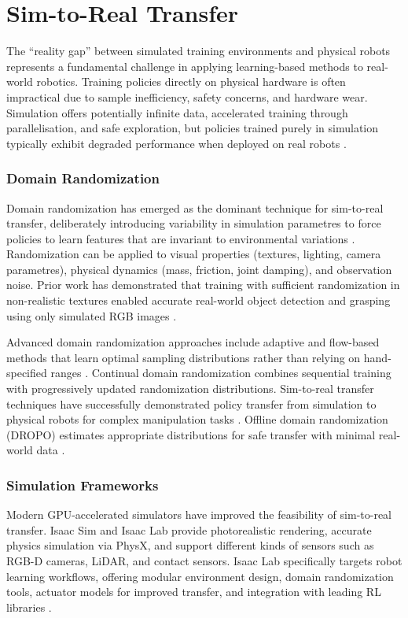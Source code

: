 \documentclass[12pt,a4paper,oneside]{report}
\begin{document}
\section{Sim-to-Real Transfer}

The ``reality gap'' between simulated training environments and physical robots represents a fundamental challenge in applying learning-based methods to real-world robotics. Training policies directly on physical hardware is often impractical due to sample inefficiency, safety concerns, and hardware wear. Simulation offers potentially infinite data, accelerated training through parallelisation, and safe exploration, but policies trained purely in simulation typically exhibit degraded performance when deployed on real robots \cite{zhaoSimtoRealTransferDeep2020b, muratoreSimtoRealTransferDeep2022, chengZeroshotSimtorealTransfer2023}.

\subsubsection{Domain Randomization}
Domain randomization has emerged as the dominant technique for sim-to-real transfer, deliberately introducing variability in simulation parametres to force policies to learn features that are invariant to environmental variations \cite{wengDomainRandomizationSim2Real2019}. Randomization can be applied to visual properties (textures, lighting, camera parametres), physical dynamics (mass, friction, joint damping), and observation noise. Prior work has demonstrated that training with sufficient randomization in non-realistic textures enabled accurate real-world object detection and grasping using only simulated RGB images \cite{tobinDomainRandomizationTransferring2017a}.

Advanced domain randomization approaches include adaptive and flow-based methods that learn optimal sampling distributions rather than relying on hand-specified ranges \cite{yuanFlowbasedDomainRandomization2025}. Continual domain randomization combines sequential training with progressively updated randomization distributions. Sim-to-real transfer techniques have successfully demonstrated policy transfer from simulation to physical robots for complex manipulation tasks \cite{pengSimtoRealTransferRobotic2018}. Offline domain randomization (DROPO) estimates appropriate distributions for safe transfer with minimal real-world data \cite{openaiLearningDexterousInHand2019b}.

\subsubsection{Simulation Frameworks}
Modern GPU-accelerated simulators have improved the feasibility of sim-to-real transfer. Isaac Sim and Isaac Lab provide photorealistic rendering, accurate physics simulation via PhysX, and support different kinds of sensors such as RGB-D cameras, LiDAR, and contact sensors. Isaac Lab specifically targets robot learning workflows, offering modular environment design, domain randomization tools, actuator models for improved transfer, and integration with leading RL libraries \cite{nvidiaIsaacLabUnified2024}.
\end{document}
